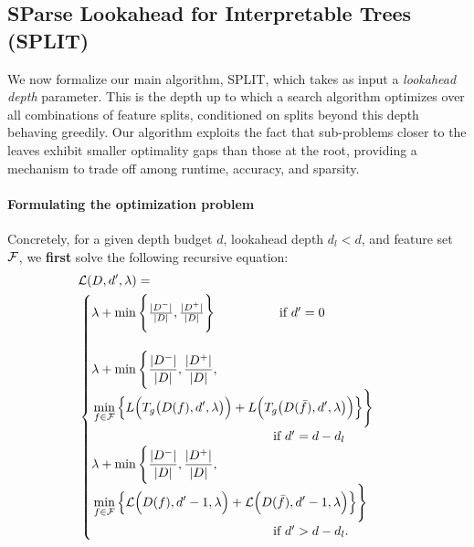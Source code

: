 \subsection{SParse Lookahead for Interpretable Trees (SPLIT)}

We now formalize our main algorithm, SPLIT, which takes as input a \textit{lookahead depth} parameter. This is the depth up to which a search algorithm optimizes over all combinations of feature splits, conditioned on splits beyond this depth behaving greedily. Our algorithm exploits the fact that sub-problems closer to the leaves exhibit smaller optimality gaps than those at the root, providing a mechanism to trade off among runtime, accuracy, and sparsity.
\paragraph{Formulating the optimization problem} 
Concretely, for a given depth budget $d$, lookahead depth $d_l < d$, and feature set $\mathcal{F}$, we \textbf{first} solve the following recursive equation:
{
\begin{align} 
\label{eqn:lookahead_eqn_og}
    &\mcL(D, d^\prime, \lambda) = \nonumber \\
    &\begin{cases}
    \lambda + \min\Bigg\{\frac{|D^-|}{|D|}, \frac{|D^+|}{|D|}\Bigg\}\ \ \hspace{1.55cm} \text{if $d^\prime=0$} \\ \\
    \begin{aligned}
        &\lambda + \min\Bigg\{\frac{|D^-|}{|D|}, \frac{|D^+|}{|D|},\\& \min_{f \in \mcF}\Big\{L\Big(T_g\big(D(f),d^\prime, \lambda\big)\Big) + L\Big(T_g\big(D(\bar{f}), d^\prime, \lambda\big)\Big)\Big\}\Bigg\} \end{aligned} \ \ \\ \hspace{5cm} \text{if $d^\prime = d-d_l$} \\
    \begin{aligned}
    &\lambda + \min\Bigg\{\frac{|D^-|}{|D|},\frac{|D^+|}{|D|},\\ &\min_{f \in \mcF}\Big\{\mcL\Big(D(f), d^\prime-1, \lambda\Big) + \mcL\Big(D(\bar{f}), d^\prime-1, \lambda\Big)\Big\}
        \Bigg\}\end{aligned} \ \ \\ \hspace{5cm}\text{if $d^\prime > d-d_l$.}
    \end{cases}
\end{align}
}
